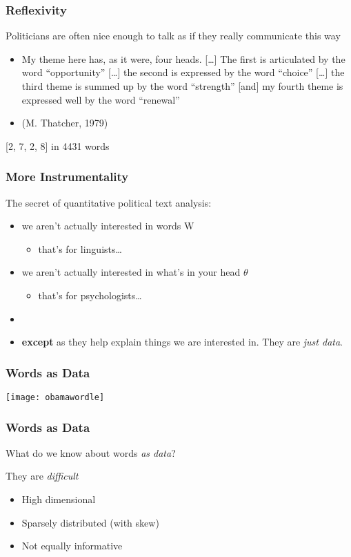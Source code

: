 \documentclass[11pt,compress,professionalfonts]{beamer}
\newcommand{\ita}{\begin{itemize}}
\newcommand{\itm}{\item[]}
\newcommand{\itz}{\end{itemize}}
\begin{document}
\begin{frame}[t,fragile]\frametitle{Reflexivity}

Politicians are often nice enough to talk as if they really communicate this way

\ita
\itm My theme here has, as it were, four heads. [\ldots] The first is articulated by the word ``opportunity'' [\ldots] the second is expressed by the word ``choice'' [\ldots] the third theme is summed up by the word ``strength'' [and] my fourth theme is expressed well by the word ``renewal''
\itm (M. Thatcher, 1979)
\itz

[2, 7, 2, 8] in 4431 words

\end{frame}
\begin{frame}[t,fragile]\frametitle{More Instrumentality}

The secret of quantitative political text analysis:
\ita
\itm we aren't actually interested in words W
\ita
\itm that's for linguists\ldots
\itz
\itm we aren't actually interested in what's in your head $\theta$
\ita
\itm that's for psychologists\ldots
\itz
\itm
\itm \textbf{except} as they help explain things we are interested in.  They are \textit{just data}.
\itz


%
%
%

\end{frame}
\begin{frame}[t,fragile]\frametitle{Words as Data}
\begin{center}
\texttt{[image: obamawordle]}
\end{center}


\end{frame}
\begin{frame}[t,fragile]\frametitle{Words as Data}

What do we know about words \textit{as data}?

They are \textit{difficult}
\ita
\itm High dimensional
\itm Sparsely distributed (with skew)
\itm Not equally informative
\itz


\end{frame}
\end{document}
